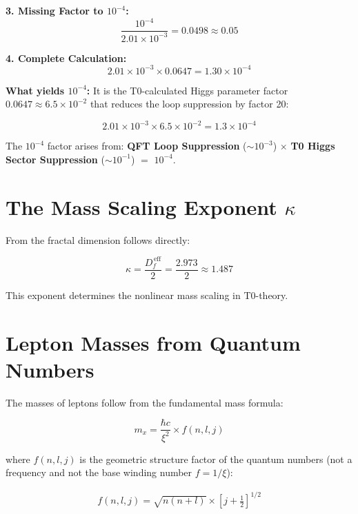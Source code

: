 \textbf{3. Missing Factor to $10^{-4}$:}
\begin{equation}
	\frac{10^{-4}}{2.01 \times 10^{-3}} = 0.0498 \approx 0.05
\end{equation}

\textbf{4. Complete Calculation:}
\begin{equation}
	2.01 \times 10^{-3} \times 0.0647 = 1.30 \times 10^{-4}
\end{equation}

\textbf{What yields $10^{-4}$:}
It is the T0-calculated Higgs parameter factor $0.0647 \approx 6.5 \times 10^{-2}$ that reduces the loop suppression by factor 20:

\begin{equation}
	2.01 \times 10^{-3} \times 6.5 \times 10^{-2} = 1.3 \times 10^{-4}
\end{equation}

The $10^{-4}$ factor arises from: \textbf{QFT Loop Suppression} ($\sim 10^{-3}$) $\times$ \textbf{T0 Higgs Sector Suppression} ($\sim 10^{-1}$) $=$ $10^{-4}$.

	\section{The Mass Scaling Exponent $\kappa$}
	
	From the fractal dimension follows directly:
	
	\begin{equation}
		\kappa = \frac{D_f^{\,\text{eff}}}{2} = \frac{2.973}{2} \approx 1.487
	\end{equation}
	
	This exponent determines the nonlinear mass scaling in T0-theory.
	
	\section{Lepton Masses from Quantum Numbers}
	
	The masses of leptons follow from the fundamental mass formula:
	
	\begin{equation}
		m_x = \frac{\hbar c}{\xi^2} \times f(n, l, j)
	\end{equation}

	where $f(n, l, j)$ is the geometric structure factor of the quantum numbers (not a frequency and not the base winding number $f = 1/\xi$):
	
	\begin{align}
		f(n, l, j) = \sqrt{n(n+l)} \times \left[j + \frac{1}{2}\right]^{1/2}
	\end{align}
	
